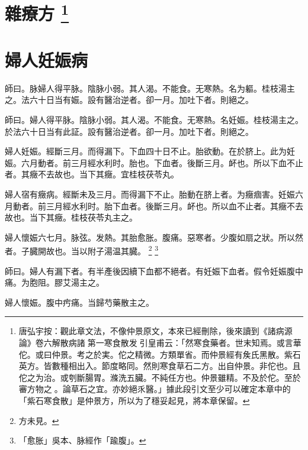 \chapter{雜療方
	\footnote{
		唐弘宇按：觀此章文法，不像仲景原文，本來已經刪除，後來讀到《諸病源{\sungtpii 𠊱}論》卷六解散病諸{\sungtpii 𠊱}第一寒食散发{\sungtpii 𠊱}引皇甫云：「然寒食藥者。世末知焉。或言華佗。或曰仲景。考之於実。佗之精微。方類單省。而仲景經有矦氏黑散。紫石英方。皆數種相出入。節度略同。然則寒食草石二方。出自仲景。非佗也。且佗之为治。或刳斷腸胃。滌洗五臟。不純任方也。仲景雖精。不及於佗。至於審方物之{\sungtpii 𠊱}。論草石之宜。亦妙絕乑醫。」據此段引文至少可以確定本章中的「紫石寒食散」是仲景方，所以为了穩妥起見，將本章保留。
	}
}







\chapter{婦人妊娠病}

師曰。脉婦人得平脉。陰脉小弱。其人渴。不能食。无寒熱。名为軀。桂枝湯主之。法六十日当有娠。設有醫治逆者。卻一月。加吐下者。則絕之。{\wuben}

師曰。婦人得平脉。陰脉小弱。其人渴。不能食。无寒熱。名妊娠。桂枝湯主之。於法六十日当有此証。設有醫治逆者。卻一月。加吐下者。則絕之。{\dengben}

婦人妊娠。經斷三月。而得漏下。下血四十日不止。胎欲動。在於脐上。此为妊娠。六月動者。前三月經水利时。胎也。下血者。後斷三月。衃也。所以下血不止者。其癥不去故也。当下其癥。宜桂枝茯苓丸。{\wuben}

婦人宿有癥病。經斷未及三月。而得漏下不止。胎動在脐上者。为癥痼害。妊娠六月動者。前三月經水利时。胎下血者。後斷三月。衃也。所以血不止者。其癥不去故也。当下其癥。桂枝茯苓丸主之。{\dengben}

婦人懷娠六七月。脉弦。发熱。其胎愈胀。腹痛。惡寒者。少腹如扇之狀。所以然者。子臓開故也。当以附子湯温其臓。
	\footnote{方未見。}
	\footnote{「愈胀」吳本、脉經作「踰腹」。}

師曰。婦人有漏下者。有半產後因續下血都不絕者。有妊娠下血者。假令妊娠腹中痛。为胞阻。膠艾湯主之。

婦人懷娠。腹中㽲痛。当歸芍藥散主之。


